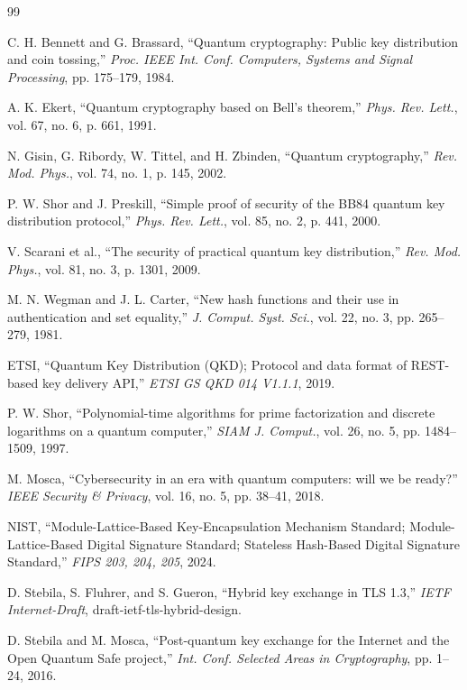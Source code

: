 \documentclass[11pt,letterpaper]{article}
\begin{document}
\begin{thebibliography}{99}

C. H. Bennett and G. Brassard,
``Quantum cryptography: Public key distribution and coin tossing,''
\textit{Proc. IEEE Int. Conf. Computers, Systems and Signal Processing}, pp. 175--179, 1984.

A. K. Ekert,
``Quantum cryptography based on Bell's theorem,''
\textit{Phys. Rev. Lett.}, vol. 67, no. 6, p. 661, 1991.

N. Gisin, G. Ribordy, W. Tittel, and H. Zbinden,
``Quantum cryptography,''
\textit{Rev. Mod. Phys.}, vol. 74, no. 1, p. 145, 2002.

P. W. Shor and J. Preskill,
``Simple proof of security of the BB84 quantum key distribution protocol,''
\textit{Phys. Rev. Lett.}, vol. 85, no. 2, p. 441, 2000.

V. Scarani et al.,
``The security of practical quantum key distribution,''
\textit{Rev. Mod. Phys.}, vol. 81, no. 3, p. 1301, 2009.

M. N. Wegman and J. L. Carter,
``New hash functions and their use in authentication and set equality,''
\textit{J. Comput. Syst. Sci.}, vol. 22, no. 3, pp. 265--279, 1981.

ETSI,
``Quantum Key Distribution (QKD); Protocol and data format of REST-based key delivery API,''
\textit{ETSI GS QKD 014 V1.1.1}, 2019.

P. W. Shor,
``Polynomial-time algorithms for prime factorization and discrete logarithms on a quantum computer,''
\textit{SIAM J. Comput.}, vol. 26, no. 5, pp. 1484--1509, 1997.

M. Mosca,
``Cybersecurity in an era with quantum computers: will we be ready?''
\textit{IEEE Security \& Privacy}, vol. 16, no. 5, pp. 38--41, 2018.

NIST,
``Module-Lattice-Based Key-Encapsulation Mechanism Standard; Module-Lattice-Based Digital Signature Standard; Stateless Hash-Based Digital Signature Standard,''
\textit{FIPS 203, 204, 205}, 2024.

D. Stebila, S. Fluhrer, and S. Gueron,
``Hybrid key exchange in TLS 1.3,''
\textit{IETF Internet-Draft}, draft-ietf-tls-hybrid-design.

D. Stebila and M. Mosca,
``Post-quantum key exchange for the Internet and the Open Quantum Safe project,''
\textit{Int. Conf. Selected Areas in Cryptography}, pp. 1--24, 2016.


\end{thebibliography}
\end{document}
